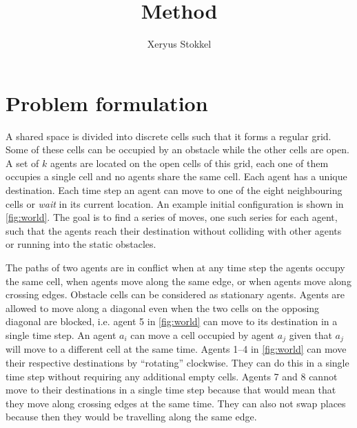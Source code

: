 \documentclass[a4paper]{article}
\title{Method}
\author{Xeryus Stokkel}
\date{}
\begin{document}
\maketitle

\section{Problem formulation}

A shared space is divided into discrete cells such that it forms a regular
grid. Some of these cells can be occupied by an obstacle while the other cells
are open. A set of $k$ agents are located on the open cells of this grid, each
one of them occupies a single cell and no agents share the same cell. Each
agent has a unique destination. Each time step an agent can move to one of the
eight neighbouring cells or \emph{wait} in its current location. An example
initial configuration is shown in \autoref{fig:world}. The goal is to find a
series of moves, one such series for each agent, such that the agents reach
their destination without colliding with other agents or running into the
static obstacles.

The paths of two agents are in conflict when at any time step the agents occupy
the same cell, when agents move along the same edge, or when agents move along
crossing edges. Obstacle cells can be considered as stationary agents. Agents
are allowed to move along a diagonal even when the two cells on the opposing
diagonal are blocked, i.e. agent 5 in \autoref{fig:world} can move to its
destination in a single time step. An agent $a_i$ can move a cell occupied by
agent $a_j$ given that $a_j$ will move to a different cell at the same time.
Agents 1--4 in \autoref{fig:world} can move their respective destinations
by ``rotating'' clockwise. They can do this in a single time step without
requiring any additional empty cells. Agents 7 and 8 cannot move to their
destinations in a single time step because that would mean that they move along
crossing edges at the same time. They can also not swap places because then
they would be travelling along the same edge.
\end{document}
